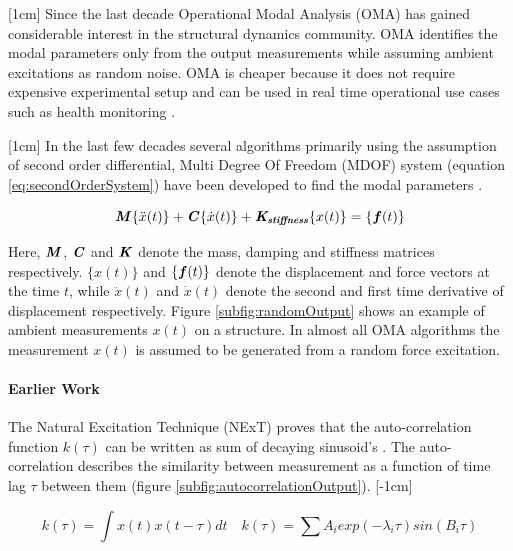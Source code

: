 [1cm]
Since the last decade Operational Modal Analysis (OMA) has gained considerable interest in the structural dynamics community. OMA identifies the modal parameters only from the output measurements while assuming ambient excitations as random noise. OMA is cheaper because it does not require expensive experimental setup and can be used in real time operational use cases such as health monitoring \cite{peeters2005industrial, shahdin2010correlating, rainieri2007automated}. 

[1cm]
In the last few decades several algorithms primarily using the assumption of second order differential, Multi Degree Of Freedom (MDOF) system (equation \ref{eq:secondOrderSystem}) have been developed to find the modal parameters \cite{guillaume2003poly, richardson1982parameter}.

\begin{equation}\label{eq:secondOrderSystem}
    \bm{\mathit{M}}\{\ddot{x}(t)\} + \bm{\mathit{C}}\{\dot{x}(t)\} + \bm{\mathit{K_{stiffness}}}\{x(t)\} = \{\boldsymbol{f}(t)\}
\end{equation}

Here, $\bm{\mathit{M}}$, $\bm{\mathit{C}}$ and $\bm{\mathit{K}}$ denote the mass, damping and stiffness matrices respectively. $\{x(t)\}$ and $\{\boldsymbol{f}(t)\}$ denote the displacement and force vectors at the time $t$, while $\ddot{x}(t)$ and $\dot{x}(t)$ denote the second and first time derivative of displacement respectively. Figure \ref{subfig:randomOutput} shows an example of ambient measurements $x(t)$ on a structure.  In almost all OMA algorithms the measurement $x(t)$ is assumed to be generated from a random force excitation. 

\paragraph{Earlier Work}
The Natural Excitation Technique (NExT) \cite{james1995natural} proves that the auto-correlation function $k(\tau)$ can be written as sum of decaying sinusoid's \cite{spitznogle1970representation, ibrahim1977method, guillaume2003poly}. The auto-correlation describes the similarity between measurement as a function of time lag $\tau$ between them (figure \ref{subfig:autocorrelationOutput}).  
[-1cm]

\begin{equation}\label{eq:NeXT}
    k(\tau) = \int x(t)x(t-\tau)dt \quad k(\tau) = \sum A_{i}exp(-\lambda_{i}\tau)sin(B_{i}\tau)
\end{equation}

